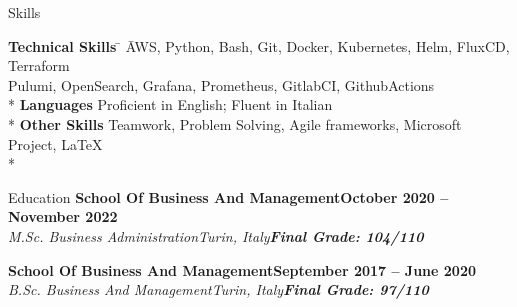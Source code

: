 \documentclass[a4paper]{article}
\newlength{\tabin}
\newlength{\secsep}
\newcommand{\lineunder}{\vspace*{-8pt}\\\hspace*{-6pt}\hrulefill\\\vspace*{-15pt}}
\newcommand{\educationwithgrade}[5]{\vspace{\secsep}\textbf{#1\hfill#2}\\\textit{#3\hfill#4}\linebreak\textbf{\textit{#5}}\vspace{2\secsep}}
\newenvironment{tabbedsection}[1]{
  \begin{list}{}{
    \setlength{\itemsep}{0pt}
    \setlength{\labelsep}{0pt}
    \setlength{\labelwidth}{0pt}
    \setlength{\leftmargin}{\tabin}
    \setlength{\rightmargin}{\tabin}
    \setlength{\listparindent}{0pt}
    \setlength{\parsep}{0pt}
    \setlength{\parskip}{0pt}
    \setlength{\partopsep}{0pt}
    \setlength{\topsep}{#1}
  }
  \item[]
}{\end{list}}
\newenvironment{nospacetabbing}{\begin{tabbing}}{\end{tabbing}\vspace{-1.2em}}
\newenvironment{resume_section}[1]{
  \filbreak
  \vspace{2\secsep}
  \textsc{\large#1}
  \lineunder
  \begin{tabbedsection}{\secsep}
}{\end{tabbedsection}}
\newenvironment{resume_subsection}[2]{
  \vspace{\secsep}
  \textbf{#1 \hfill #2} \\ \vspace{-10pt}
  \begin{tabbedsection}{0.5\secsep}
}{\end{tabbedsection}}
\newenvironment{subitems}{
  \renewcommand{\labelitemi}{-}
  \begin{itemize}
  \setlength{\labelsep}{1em}
}{\end{itemize}}
\begin{document}




\begin{resume_section}{Skills}
  \begin{nospacetabbing}
    \textbf{Technical Skills} \= \hspace{2em} \= AWS, Python, Bash, Git, Docker, Kubernetes, Helm, FluxCD, Terraform\\\> \> Pulumi, OpenSearch, Grafana, Prometheus, GitlabCI, GithubActions\\*
    \textbf{Languages} \> \> Proficient in English; Fluent in Italian\\*
    \textbf{Other Skills} \> \> Teamwork, Problem Solving, Agile frameworks, Microsoft Project, \LaTeX\\*
  \end{nospacetabbing}
\end{resume_section}

\begin{resume_section}{Education}
  \educationwithgrade{School Of Business And Management}{October 2020 -- November 2022}{M.Sc. Business Administration}{Turin, Italy}{Final Grade: 104/110}

  \educationwithgrade{School Of Business And Management}{September 2017 -- June 2020}{B.Sc. Business And Management}{Turin, Italy}{Final Grade: 97/110}
\end{resume_section}
\end{document}
